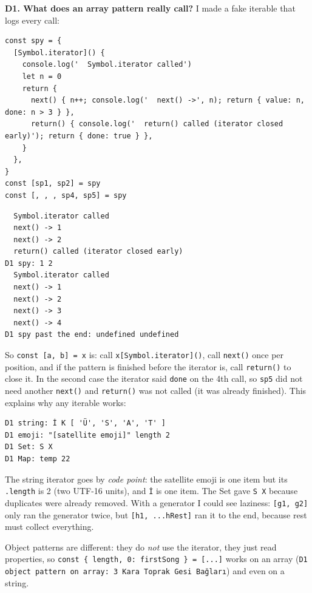 \textbf{D1. What does an array pattern really call?} I made a fake iterable that logs every call:

\begin{lstlisting}
const spy = {
  [Symbol.iterator]() {
    console.log('  Symbol.iterator called')
    let n = 0
    return {
      next() { n++; console.log('  next() ->', n); return { value: n, done: n > 3 } },
      return() { console.log('  return() called (iterator closed early)'); return { done: true } },
    }
  },
}
const [sp1, sp2] = spy
const [, , , sp4, sp5] = spy
\end{lstlisting}

\begin{lstlisting}
  Symbol.iterator called
  next() -> 1
  next() -> 2
  return() called (iterator closed early)
D1 spy: 1 2
  Symbol.iterator called
  next() -> 1
  next() -> 2
  next() -> 3
  next() -> 4
D1 spy past the end: undefined undefined
\end{lstlisting}

So \passthrough{\lstinline!const [a, b] = x!} is: call \passthrough{\lstinline!x[Symbol.iterator]()!}, call \passthrough{\lstinline!next()!} once per position, and if the pattern is finished before the iterator is, call \passthrough{\lstinline!return()!} to close it. In the second case the iterator said \passthrough{\lstinline!done!} on the 4th call, so \passthrough{\lstinline!sp5!} did not need another \passthrough{\lstinline!next()!} and \passthrough{\lstinline!return()!} was not called (it was already finished). This explains why any iterable works:

\begin{lstlisting}
D1 string: İ K [ 'Ü', 'S', 'A', 'T' ]
D1 emoji: "[satellite emoji]" length 2
D1 Set: S X
D1 Map: temp 22
\end{lstlisting}

The string iterator goes by \emph{code point}: the satellite emoji is one item but its \passthrough{\lstinline!.length!} is 2 (two UTF-16 units), and \passthrough{\lstinline!İ!} is one item. The Set gave \passthrough{\lstinline!S X!} because duplicates were already removed. With a generator I could see laziness: \passthrough{\lstinline![g1, g2]!} only ran the generator twice, but \passthrough{\lstinline![h1, ...hRest]!} ran it to the end, because rest must collect everything.

Object patterns are different: they do \emph{not} use the iterator, they just read properties, so \passthrough{\lstinline!const \{ length, 0: firstSong \} = [...]!} works on an array (\passthrough{\lstinline!D1 object pattern on array: 3 Kara Toprak Gesi Bağları!}) and even on a string.

